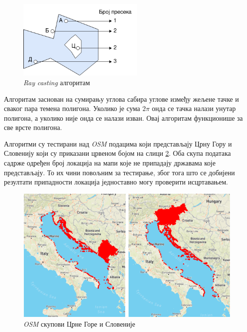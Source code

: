 \documentclass[12pt,oneside]{memoir}
\begin{document}
\begin{figure}[!ht]
  \centering
  \includegraphics[width=0.55\textwidth]{pictures/ray_cast_pic_example.png}
  \caption{\textit{Ray casting} алгоритам}
  \label{fig:ray_cast_algo_example}
\end{figure}

Алгоритам заснован на сумирању углова сабира углове између жељене тачке и сваког пара темена полигона. Уколико је сума $2\pi$ онда се тачка налази унутар полигона, а уколико није онда се налази изван. Овај алгоритам функционише за све врсте полигона.

Алгоритми су тестирани над \textit{OSM} подацима који представљају Црну Гору и Словенију који су приказани црвеном бојом на слици \ref{fig:all_map_slo_mon_example}. Оба скупа података садрже одређен број локација на мапи које не припадају државама које представљају. То их чини повољним за тестирање, због тога што се добијени резултати припадности локација једноставно могу проверити исцртавањем.

\begin{figure}[!ht]
  \centering
  \includegraphics[width=1\textwidth]{pictures/mon_slo_totals.png}
  \caption{\textit{OSM} скупови Црне Горе и Словеније}
  \label{fig:all_map_slo_mon_example}
\end{figure}
\end{document}
